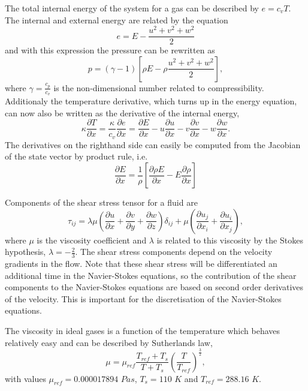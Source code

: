 \documentclass{report}
\newcommand{\dx}[1]{\frac{\partial #1}{\partial x}}
\newcommand{\dy}[1]{\frac{\partial #1}{\partial y}}
\newcommand{\dz}[1]{\frac{\partial #1}{\partial z}}
\begin{document}
The total internal energy of the system for a gas can be described by $e = c_vT$. The internal and external energy are related by the equation
\begin{equation}
\label{e:internalEnergy}
e = E - \frac{u^2 + v^2 + w^2}{2}
\end{equation}
and with this expression the pressure can be rewritten as
\begin{equation}
\label{e:idealGasLaw2}
p = (\gamma - 1)\left[ \rho E - \rho \frac{u^2 + v^2 + w^2}{2} \right],
\end{equation}
where $\gamma = \frac{c_p}{c_v}$ is the non-dimensional number related to compressibility. Additionaly the temperature derivative, which turns up in the energy equation, can now also be written as the derivative of the internal energy,
\begin{equation}
\label{e:temperature}
\kappa\dx{T} =  \frac{\kappa}{c_v}\dx{e} = \dx{E} - u\dx{u} - v\dx{v} -w\dx{w}.
\end{equation}
The derivatives on the righthand side can easily be computed from the Jacobian of the state vector by product rule, i.e.
\begin{equation}
\label{e:partialStatederivative}
\dx{E} = \frac{1}{\rho} \left[ \dx{\rho E} -E \dx{\rho} \right]
\end{equation}

Components of the shear stress tensor for a fluid are
\begin{equation}
\label{e:shearStressTensor}
\tau_{ij} = 
\lambda \mu \left (
\dx{u} + \dy{v} + \dz{w}
\right)
\delta_{ij}
+
\mu \left( 
\frac{\partial u_j}{\partial x_i} + \frac{\partial u_i}{\partial x_j}
\right),
\end{equation}
where $\mu$ is the viscosity coefficient and $\lambda$ is related to this viscosity by the Stokes hypothesis, $\lambda = - \frac{2}{3}$. The shear stress components depend on the velocity gradients in the flow. Note that these shear stress will be differentiated an additional time in the Navier-Stokes equations, so the contribution of the shear components to the Navier-Stokes equations are based on second order derivatives of the velocity. This is important for the discretisation of the Navier-Stokes equations.

The viscosity in ideal gases is a function of the temperature which behaves relatively easy and can be described by Sutherlands law,
\begin{equation}
\label{e:SutherlandsLaw}
\mu = \mu_{ref}  \frac{T_{ref} + T_s}{T + T_s} \left( \frac{T}{T_{ref}} \right)^\frac{3}{2},
\end{equation}
with values $\mu_{ref} = 0.000017894$ $Pa s$, $T_s = 110$ $K$ and $T_{ref} = 288.16$ $K$.
\end{document}
